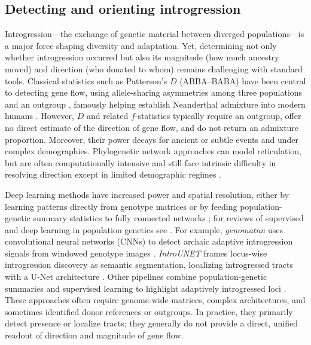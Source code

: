 \documentclass[11pt]{article}
\theoremstyle{plain}
\theoremstyle{definition}
\theoremstyle{remark}
\begin{document}
\subsection{Detecting and orienting introgression}
Introgression—the exchange of genetic material between diverged populations—is a major force shaping diversity and adaptation. Yet, determining not only whether introgression occurred but also its magnitude (how much ancestry moved) and direction (who donated to whom) remains challenging with standard tools. Classical statistics such as Patterson’s $D$ (ABBA–BABA) have been central to detecting gene flow, using allele-sharing asymmetries among three populations and an outgroup \citep{patterson2012ancient,durand2011testing}, famously helping establish Neanderthal admixture into modern humans \citep{green2010neandertal}. However, $D$ and related $f$-statistics \citep{peter2016admixture} typically require an outgroup, offer no direct estimate of the direction of gene flow, and do not return an admixture proportion. Moreover, their power decays for ancient or subtle events and under complex demographies. Phylogenetic network approaches can model reticulation, but are often computationally intensive and still face intrinsic difficulty in resolving direction except in limited demographic regimes \citep{thawornwattana2023direction,pease2015detection,hibbins2022phylogenomic}.

Deep learning methods have increased power and spatial resolution, either by learning patterns directly from genotype matrices \citep{flagel2019unreasonable,chan2018likelihood} or by feeding population-genetic summary statistics to fully connected networks \citep{sheehan2016deep}; for reviews of supervised and deep learning in population genetics see \citet{schrider2018supervised,korfmann2023deep}. For example, \textit{genomatnn} uses convolutional neural networks (CNNs) to detect archaic adaptive introgression signals from windowed genotype images \citep{gower2021genomatnn}. \textit{IntroUNET} frames locus-wise introgression discovery as semantic segmentation, localizing introgressed tracts with a U-Net architecture \citep{ray2024introunet}. Other pipelines combine population-genetic summaries and supervised learning to highlight adaptively introgressed loci \citep{racimo2015archaic}. These approaches often require genome-wide matrices, complex architectures, and sometimes identified donor references or outgroups. In practice, they primarily detect presence or localize tracts; they generally do not provide a direct, unified readout of direction and magnitude of gene flow.
\end{document}
